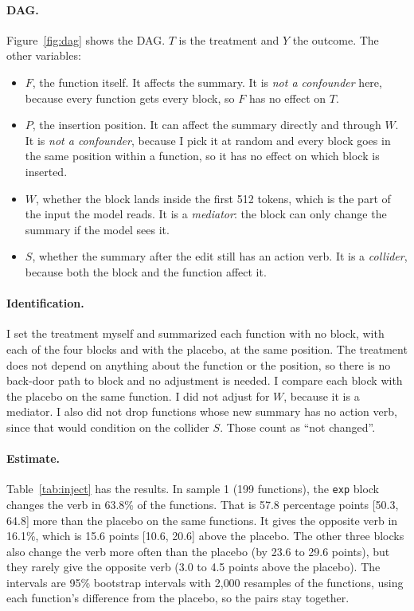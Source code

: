 \documentclass{article}
\newcommand{\code}[1]{\texttt{#1}}
\begin{document}
\paragraph{DAG.} Figure~\ref{fig:dag} shows the DAG. $T$ is the treatment and $Y$ the outcome. The other variables:
\begin{itemize}\setlength\itemsep{0pt}
\item $F$, the function itself. It affects the summary. It is \emph{not a confounder} here, because
  every function gets every block, so $F$ has no effect on $T$.
\item $P$, the insertion position. It can affect the summary directly and through $W$. It is
  \emph{not a confounder}, because I pick it at random and every block goes in the same position within
  a function, so it has no effect on which block is inserted.
\item $W$, whether the block lands inside the first 512 tokens, which is the part of the input the
  model reads. It is a \emph{mediator}: the block can only change the summary if the model sees it.
\item $S$, whether the summary after the edit still has an action verb. It is a \emph{collider},
  because both the block and the function affect it.
\end{itemize}

\paragraph{Identification.} I set the treatment myself and summarized each function with no block,
with each of the four blocks and with the placebo, at the same position. The treatment does not
depend on anything about the function or the position, so there is no back-door path to block and no
adjustment is needed. I compare each
block with the placebo on the same function. I did not adjust for $W$, because it is a mediator.
I also did not drop functions whose new summary has no action verb, since that would condition on
the collider $S$. Those count as ``not changed''.

\paragraph{Estimate.} Table~\ref{tab:inject} has the results. In sample 1 (199 functions), the
\code{exp} block changes the verb in 63.8\% of the functions. That is 57.8 percentage points
[50.3, 64.8] more than the placebo on the same functions. It gives the opposite verb in 16.1\%, which
is 15.6 points [10.6, 20.6] above the placebo. The other three blocks also change the verb more often
than the placebo (by 23.6 to 29.6 points), but they rarely give the opposite verb (3.0 to 4.5 points
above the placebo). The intervals are 95\% bootstrap intervals with 2{,}000 resamples of the
functions, using each function's difference from the placebo, so the pairs stay together.
\end{document}
